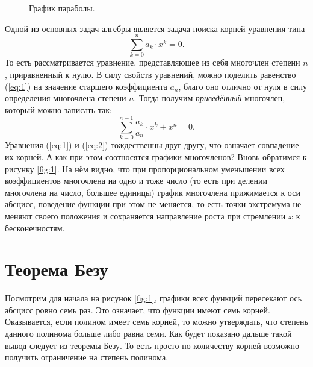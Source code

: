 \documentclass[12pt]{article}
\begin{document}
\begin{figure}[htbp]
\centering
{}
\caption{График параболы.}
\label{fig:2}
\end{figure}
\par
Одной из основных задач алгебры является задача поиска корней уравнения типа
\begin{equation}\label{eq:1}
\sum_{k=0}^n{a_k \cdot x^k} = 0.
\end{equation}
То есть рассматривается уравнение, представляющее из себя многочлен степени $n$, приравненный к нулю. В силу свойств уравнений, можно поделить равенство (\ref{eq:1}) на значение старшего коэффициента $a_n$, благо оно отлично от нуля в силу определения многочлена степени $n$. Тогда получим \emph{приведённый} многочлен, который можно записать так:
\begin{equation}\label{eq:2}
\sum_{k=0}^{n-1}{\dfrac{a_k}{a_n} \cdot x^k} + x^n = 0.
\end{equation}
Уравнения (\ref{eq:1}) и (\ref{eq:2}) тождественны друг другу, что означает совпадение их корней. А как при этом соотносятся графики многочленов? Вновь обратимся к рисунку \ref{fig:1}. На нём видно, что при пропорциональном уменьшении всех коэффициентов многочлена на одно и тоже число (то есть при делении многочлена на число, большее единицы) график многочлена прижимается к оси абсцисс, поведение функции при этом не меняется, то есть точки экстремума не меняют своего положения и сохраняется направление роста при стремлении $x$ к бесконечностям.

\section{Теорема Безу}
Посмотрим для начала на рисунок \ref{fig:1}, графики всех функций пересекают ось абсцисс ровно семь раз. Это означает, что функции имеют семь корней. Оказывается, если полином имеет семь корней, то можно утверждать, что степень данного полинома больше либо равна семи. Как будет показано дальше такой вывод следует из теоремы Безу. То есть просто по количеству корней возможно получить ограничение на степень полинома.
\end{document}
